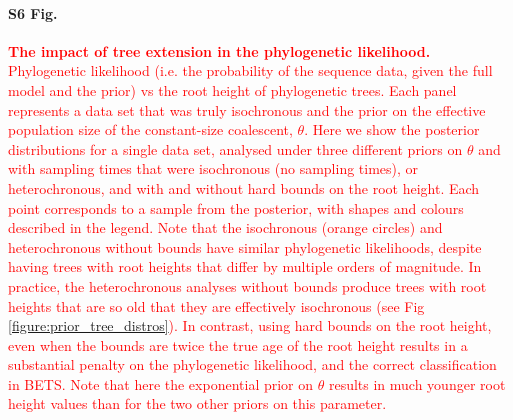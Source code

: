\documentclass[10pt,letterpaper]{article}
\begin{document}
\paragraph*{S6 Fig.}
\label{S6_Fig}
	\textcolor{red}{\textbf{The impact of tree extension in the phylogenetic likelihood.} Phylogenetic likelihood (i.e. the probability of the sequence data, given the full model and the prior) vs the root height of phylogenetic trees. Each panel represents a data set that was truly isochronous and the prior on the effective population size of the constant-size coalescent, $\theta$. Here we show the posterior distributions for a single data set, analysed under three different priors on $\theta$ and with sampling times that were isochronous (no sampling times), or heterochronous, and with and without hard bounds on the root height. Each point corresponds to a sample from the posterior, with shapes and colours described in the legend. Note that the isochronous (orange circles) and heterochronous without bounds have similar phylogenetic likelihoods, despite having trees with root heights that differ by multiple orders of magnitude. In practice, the heterochronous analyses without bounds produce trees with root heights that are so old that they are effectively isochronous (see Fig \ref{figure:prior_tree_distros}). In contrast, using hard bounds on the root height, even when the bounds are twice the true age of the root height results in a substantial penalty on the phylogenetic likelihood, and the correct classification in BETS. Note that here the exponential prior on $\theta$ results in much younger root height values than for the two other priors on this parameter.}





\end{document}
